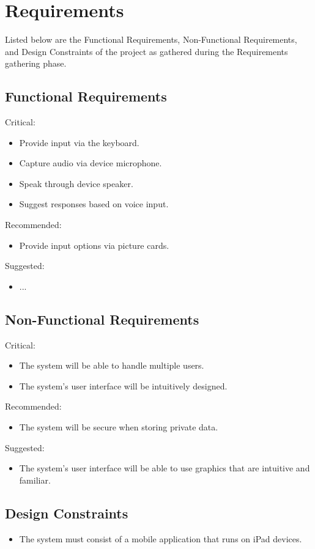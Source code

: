 \chapter{Requirements}

Listed below are the Functional Requirements, Non-Functional Requirements, and Design Constraints of the project as gathered during the Requirements gathering phase.

\section{Functional Requirements}
Critical:
\begin{itemize}
\item Provide input via the keyboard.
\item Capture audio via device microphone.
\item Speak through device speaker.
\item Suggest responses based on voice input.

\end{itemize}
Recommended:
\begin{itemize}
\item Provide input options via picture cards.
\end{itemize}
Suggested:
\begin{itemize}
\item ...
\end{itemize}

\section{Non-Functional Requirements}
Critical:
\begin{itemize}
\item The system will be able to handle multiple users.
\item The system's user interface will be intuitively designed.
\end{itemize}
Recommended:
\begin{itemize}
\item The system will be secure when storing private data.
\end{itemize}
Suggested:
\begin{itemize}
\item The system's user interface will be able to use graphics that are intuitive and familiar.
\end{itemize}

\section{Design Constraints}
\begin{itemize}
\item The system must consist of a mobile application that runs on iPad devices.
\end{itemize}